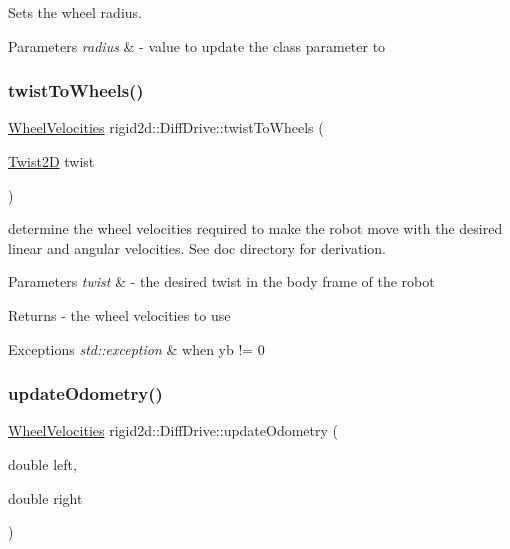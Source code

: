 Sets the wheel radius. 


\begin{DoxyParams}{Parameters}
{\em radius} & -\/ value to update the class parameter to \\
\hline
\end{DoxyParams}
\mbox{\label{classrigid2d_1_1DiffDrive_a636194ac11bb3851059989ae118bbf1d}} 
\subsubsection{\texorpdfstring{twist\+To\+Wheels()}{twistToWheels()}}
{\footnotesize\ttfamily \hyperlink{structrigid2d_1_1WheelVelocities}{Wheel\+Velocities} rigid2d\+::\+Diff\+Drive\+::twist\+To\+Wheels (\begin{DoxyParamCaption}\item[{\hyperlink{structrigid2d_1_1Twist2D}{Twist2D}}]{twist }\end{DoxyParamCaption})}



determine the wheel velocities required to make the robot move with the desired linear and angular velocities. See doc directory for derivation. 


\begin{DoxyParams}{Parameters}
{\em twist} & -\/ the desired twist in the body frame of the robot \\
\hline
\end{DoxyParams}
\begin{DoxyReturn}{Returns}
-\/ the wheel velocities to use 
\end{DoxyReturn}

\begin{DoxyExceptions}{Exceptions}
{\em std\+::exception} & when yb != 0 \\
\hline
\end{DoxyExceptions}
\mbox{\label{classrigid2d_1_1DiffDrive_aa037844753d585eca7023bfd935e084b}} 
\subsubsection{\texorpdfstring{update\+Odometry()}{updateOdometry()}}
{\footnotesize\ttfamily \hyperlink{structrigid2d_1_1WheelVelocities}{Wheel\+Velocities} rigid2d\+::\+Diff\+Drive\+::update\+Odometry (\begin{DoxyParamCaption}\item[{double}]{left,  }\item[{double}]{right }\end{DoxyParamCaption})}



